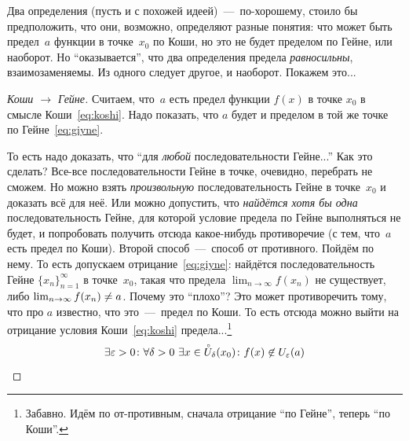 \documentclass[a4paper,12pt]{article}
\renewcommand{\mathring}[1]{\accentset{\circ}{#1}}
\begin{document}
  Два определения (пусть и с похожей идеей)~---~по-хорошему, стоило бы предположить, что они, возможно, определяют разные понятия: что может быть предел~$a$ функции в точке~$x_0$ по Коши, но это не будет пределом по Гейне, или наоборот.
  Но ``оказывается'', что два определения предела \emph{равносильны}, взаимозаменяемы.
  Из одного следует другое, и наоборот.
  Покажем это...

  \begin{proof}[Коши $\to$ Гейне]
    Считаем, что~$a$ есть предел функции $f(x)$ в точке $x_0$ в смысле Коши~\eqref{eq:koshi}.
    Надо показать, что $a$ будет и пределом в той же точке по Гейне~\eqref{eq:giyne}.

    То есть надо доказать, что ``для \emph{любой} последовательности Гейне...''
    Как это сделать?
    Все-все последовательности Гейне в точке, очевидно, перебрать не сможем.
    Но можно взять \emph{произвольную} последовательность Гейне в точке~$x_0$ и доказать всё для неё.
    Или можно допустить, что \emph{найдётся хотя бы одна} последовательность Гейне, для которой условие предела по Гейне выполняться не будет, и попробовать получить отсюда какое-нибудь противоречие (с тем, что~$a$ есть предел по Коши).
    Второй способ~---~способ от противного.
    Пойдём по нему.
    То есть допускаем отрицание~\eqref{eq:giyne}: найдётся последовательность Гейне $\{x_n\}_{n=1}^{\infty}$ в точке~$x_0$, такая что предела $\lim_{n \to \infty} f(x_n)$ не существует, либо $\lim_{n \to \infty} f(x_n) \hm{\not=} a$.
    Почему это ``плохо''?
    Это может противоречить тому, что про $a$ известно, что это~---~предел по Коши.
    То есть отсюда можно выйти на отрицание условия Коши~\eqref{eq:koshi} предела...\footnote{
      Забавно.
      Идём по от-противным, сначала отрицание ``по Гейне'', теперь ``по Коши''.
    }
    \[
      \exists \eps > 0\colon \forall \delta > 0\ \exists x \in \mathring U_{\delta}(x_0)\colon f(x) \not\in U_{\eps}(a)
    \]


\end{proof}
\end{document}
